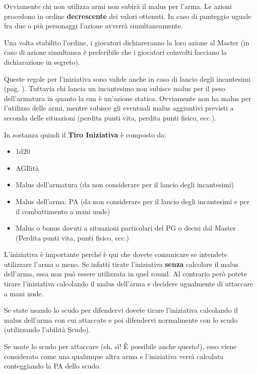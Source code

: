 Ovviamente chi non utilizza armi non subir\`a il malus per l'arma.  Le
azioni procedono in ordine \textbf{decrescente} dei valori ottenuti.
In caso di punteggio uguale fra due o pi\`u personaggi l'azione
avverr\`a simultaneamente.

Una volta stabilito l'ordine, i giocatori dichiareranno la loro azione
al Master (in caso di azione simultanea \`e preferibile che i
giocatori coinvolti facciano la dichiarazione in segreto).

  
Queste regole per l'iniziativa sono valide anche in caso di lancio
degli incantesimi (pag. \pageref{lanciareincantesimo}).
Tuttavia chi lancia un incantesimo non subisce malus per il peso
dell'armatura in quanto la sua \`e un'azione statica.  Ovviamente non
ha malus per l'utilizzo delle armi, mentre subisce gli eventuali malus
aggiuntivi previsti a seconda delle situazioni (perdita punti vita,
perdita punti fisico, ecc.).

In sostanza quindi il \textbf{Tiro Iniziativa} \`e composto da:

\begin{itemize}
  \itemsep -6pt
\item 1d20
\item AGIlit\`a
\item Malus dell'armatura (da non considerare per il lancio degli
  incantesimi)
\item Malus dell'arma: PA (da non considerare per il lancio degli
  incantesimi e per il combattimento a mani nude)
\item Malus o bonus dovuti a situazioni particolari del PG o decisi
  dal Master (Perdita punti vita, punti fisico, ecc.)
\end{itemize}

L'iniziativa \`e importante perch\'e \`e qui che dovete comunicare
se intendete utilizzare l'arma o meno. Se infatti tirate l'iniziativa
\textbf{senza} calcolare il malus dell'arma, essa non pu\`o essere utilizzata
in quel round. Al contrario per\`o potete tirare l'iniziativa
calcolando il malus dell'arma e decidere ugualmente di attaccare a
mani nude.

Se state usando lo scudo per difendervi dovete tirare l'iniziativa
calcolando il malus dell'arma con cui attaccate e poi difendervi
normalmente con lo scudo (utilizzando l'abilit\`a Scudo).

Se usate lo scudo per attaccare (eh, s\`i! \`E possibile anche
questo!), esso viene considerato come una qualunque altra arma e
l'iniziativa verr\`a calcolata conteggiando la PA dello scudo.


